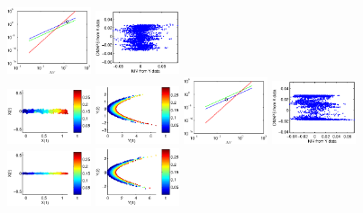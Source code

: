 \documentclass[12pt]{article}
\begin{document}
\begin{figure}
\includegraphics[width=0.22\textwidth]{error_terms_2}
\includegraphics[width=0.22\textwidth]{dmaps_corr_2} \\
%
\includegraphics[width=0.22\textwidth]{orig_data_3}
\includegraphics[width=0.22\textwidth]{function_data_3}
\includegraphics[width=0.22\textwidth]{error_terms_3}
\includegraphics[width=0.22\textwidth]{dmaps_corr_3} \\
%
\includegraphics[width=0.22\textwidth]{orig_data_4}
\includegraphics[width=0.22\textwidth]{function_data_4}

\end{figure}
\end{document}

